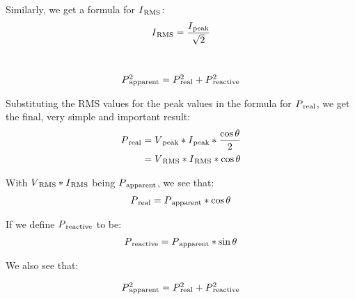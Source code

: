 \documentclass[a4paper]{article}
\def\SB#1{\textsubscript{{#1}}}
\def\SPSB#1#2{\rlap{\textsuperscript{#1}}\SB{#2}}
\begin{document}
Similarly, we get a formula for $I\SB{RMS}$:\\

\begin{align*}
  I\SB{RMS} &= \frac{I\SB{peak}}{\sqrt{2}}\\
\end{align*}\

\begin{align*}
  P\SPSB{2}{apparent} &= P\SPSB{2}{real} + P\SPSB{2}{reactive}\\
\end{align*}

Substituting the RMS values for the peak values in the formula for 
$P\SB{real}$, we get the final, very simple and important result:\\

\begin{align*}
  P\SB{real} &= V\SB{peak} * I\SB{peak} * \frac{\cos{\theta}}{2}\\
  &= V\SB{RMS} * I\SB{RMS} * \cos{\theta} \\
\end{align*}

With $V\SB{RMS} * I\SB{RMS}$ being $P\SB{apparent}$, we  see that:\\

\begin{align*}
  P\SB{real} &= P\SB{apparent} * \cos{\theta} \\
\end{align*}

If we define $P\SB{reactive}$ to be:\\

\begin{align*}
  P\SB{reactive} &= P\SB{apparent} * \sin{\theta} \\
\end{align*}

We also see that:\

\begin{align*}
  P\SPSB{2}{apparent} &= P\SPSB{2}{real} + P\SPSB{2}{reactive} \\
\end{align*}
\end{document}
